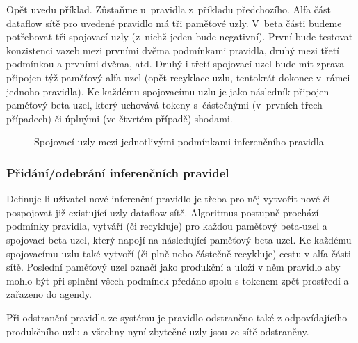 Opět uvedu příklad. Zůstaňme u~pravidla z~příkladu předchozího. Alfa část
dataflow sítě pro uvedené pravidlo má tři paměťové uzly. V~beta části
budeme potřebovat tři spojovací uzly (z~nichž jeden bude negativní).
První bude testovat konzistenci vazeb mezi prvními dvěma podmínkami
pravidla, druhý mezi třetí podmínkou a prvními dvěma, atd. Druhý i třetí
spojovací uzel bude mít zprava připojen týž paměťový alfa-uzel (opět
recyklace uzlu, tentokrát dokonce v~rámci jednoho pravidla). Ke každému
spojovacímu uzlu je jako následník připojen paměťový beta-uzel, který
uchovává tokeny s~částečnými (v~prvních třech případech) či úplnými
(ve čtvrtém případě) shodami.

\begin{figure}[h]
\centerline{}
\caption{Spojovací uzly mezi jednotlivými podmínkami inferenčního pravidla\cite{doorenbos}}
\label{condition-joining}
\end{figure}

\subsubsection{Přidání/odebrání inferenčních pravidel}
Definuje-li uživatel nové inferenční pravidlo je třeba pro něj vytvořit
nové či pospojovat již existující uzly dataflow sítě. Algoritmus postupně
prochází podmínky pravidla, vytváří (či recykluje) pro každou paměťový
beta-uzel a spojovací beta-uzel, který napojí na následující paměťový beta-uzel.
Ke každému spojovacímu uzlu také vytvoří (či plně nebo částečně recykluje)
cestu v alfa části sítě. Poslední paměťový uzel označí jako produkční
a uloží v něm pravidlo aby mohlo být při splnění všech podmínek předáno
spolu s tokenem zpět prostředí a zařazeno do agendy.

Při odstranění pravidla ze systému je pravidlo odstraněno také z odpovídajícího
produkčního uzlu a všechny nyní zbytečné uzly jsou ze sítě odstraněny.

